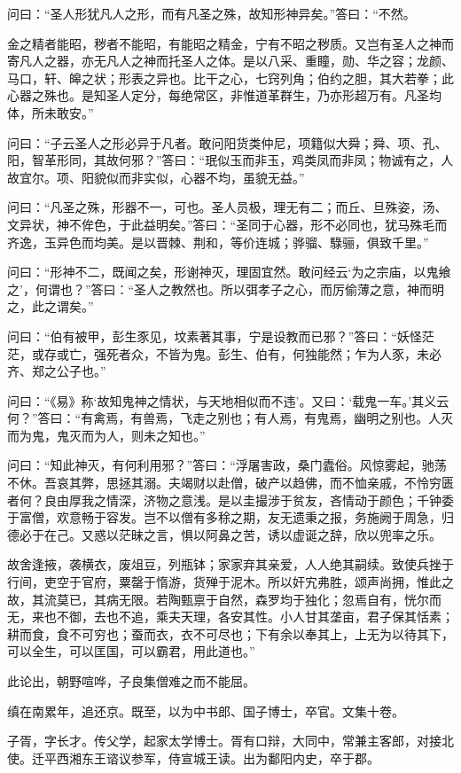 \documentclass[12pt,UTF8]{ctexbook}
\begin{document}
问曰：“圣人形犹凡人之形，而有凡圣之殊，故知形神异矣。”答曰：“不然。

金之精者能昭，秽者不能昭，有能昭之精金，宁有不昭之秽质。又岂有圣人之神而寄凡人之器，亦无凡人之神而托圣人之体。是以八采、重瞳，勋、华之容；龙颜、马口，轩、皞之状；形表之异也。比干之心，七窍列角；伯约之胆，其大若拳；此心器之殊也。是知圣人定分，每绝常区，非惟道革群生，乃亦形超万有。凡圣均体，所未敢安。”

问曰：“子云圣人之形必异于凡者。敢问阳货类仲尼，项籍似大舜；舜、项、孔、阳，智革形同，其故何邪？”答曰：“珉似玉而非玉，鸡类凤而非凤；物诚有之，人故宜尔。项、阳貌似而非实似，心器不均，虽貌无益。”

问曰：“凡圣之殊，形器不一，可也。圣人员极，理无有二；而丘、旦殊姿，汤、文异状，神不侔色，于此益明矣。”答曰：“圣同于心器，形不必同也，犹马殊毛而齐逸，玉异色而均美。是以晋棘、荆和，等价连城；骅骝、騄骊，俱致千里。”

问曰：“形神不二，既闻之矣，形谢神灭，理固宜然。敢问经云‘为之宗庙，以鬼飨之’，何谓也？”答曰：“圣人之教然也。所以弭孝子之心，而厉偷薄之意，神而明之，此之谓矣。”

问曰：“伯有被甲，彭生豕见，坟素著其事，宁是设教而已邪？”答曰：“妖怪茫茫，或存或亡，强死者众，不皆为鬼。彭生、伯有，何独能然；乍为人豕，未必齐、郑之公子也。”

问曰：“《易》称‘故知鬼神之情状，与天地相似而不违’。又曰：‘载鬼一车。’其义云何？”答曰：“有禽焉，有兽焉，飞走之别也；有人焉，有鬼焉，幽明之别也。人灭而为鬼，鬼灭而为人，则未之知也。”

问曰：“知此神灭，有何利用邪？”答曰：“浮屠害政，桑门蠹俗。风惊雾起，驰荡不休。吾哀其弊，思拯其溺。夫竭财以赴僧，破产以趋佛，而不恤亲戚，不怜穷匮者何？良由厚我之情深，济物之意浅。是以圭撮涉于贫友，吝情动于颜色；千钟委于富僧，欢意畅于容发。岂不以僧有多稌之期，友无遗秉之报，务施阙于周急，归德必于在己。又惑以茫昧之言，惧以阿鼻之苦，诱以虚诞之辞，欣以兜率之乐。

故舍逢掖，袭横衣，废俎豆，列瓶钵；家家弃其亲爱，人人绝其嗣续。致使兵挫于行间，吏空于官府，粟罄于惰游，货殚于泥木。所以奸宄弗胜，颂声尚拥，惟此之故，其流莫已，其病无限。若陶甄禀于自然，森罗均于独化；忽焉自有，恍尔而无，来也不御，去也不追，乘夫天理，各安其性。小人甘其垄亩，君子保其恬素；耕而食，食不可穷也；蚕而衣，衣不可尽也；下有余以奉其上，上无为以待其下，可以全生，可以匡国，可以霸君，用此道也。”

此论出，朝野喧哗，子良集僧难之而不能屈。

缜在南累年，追还京。既至，以为中书郎、国子博士，卒官。文集十卷。

子胥，字长才。传父学，起家太学博士。胥有口辩，大同中，常兼主客郎，对接北使。迁平西湘东王谘议参军，侍宣城王读。出为鄱阳内史，卒于郡。
\end{document}
